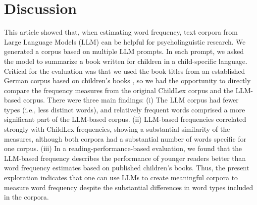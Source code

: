 \documentclass[jou, a4paper]{apa7}
\begin{document}
\section*{Discussion}

This article showed that, when estimating word frequency, text corpora from Large Language Models (LLM) can be helpful for psycholinguistic research. We generated a corpus based on multiple LLM prompts. In each prompt, we asked the model to summarize a book written for children in a child-specific language. Critical for the evaluation was that we used the book titles from an established German corpus based on children's books \citep[ChildLex; ][]{schroeder_childlex_2015}, so we had the opportunity to directly compare the frequency measures from the original ChildLex corpus and the LLM-based corpus. There were three main findings: (i) The LLM corpus had fewer types (i.e., less distinct words), and relatively frequent words comprised a more significant part of the LLM-based corpus. (ii) LLM-based frequencies correlated strongly with ChildLex frequencies, showing a substantial similarity of the measures, although both corpora had a substantial number of words specific for one corpus. (iii) In a reading-performance-based evaluation, we found that the LLM-based frequency describes the performance of younger readers better than word frequency estimates based on published children's books. Thus, the present exploration indicates that one can use LLMs to create meaningful corpora to measure word frequency despite the substantial differences in word types included in the corpora.  
\end{document}
